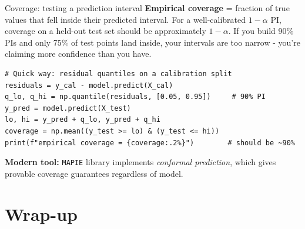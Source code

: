 \documentclass[aspectratio=169]{beamer}
\begin{document}
\begin{frame}[fragile]{Coverage: testing a prediction interval}
  \textbf{Empirical coverage} = fraction of true values that fell inside their predicted interval.
  \vfill
  For a well-calibrated $1-\alpha$ PI, coverage on a held-out test set should be approximately $1-\alpha$. If you build 90\% PIs and only 75\% of test points land inside, your intervals are too narrow - you're claiming more confidence than you have.
  \vfill
{\lstset{basicstyle=\ttfamily\scriptsize}
\begin{lstlisting}
# Quick way: residual quantiles on a calibration split
residuals = y_cal - model.predict(X_cal)
q_lo, q_hi = np.quantile(residuals, [0.05, 0.95])     # 90% PI
y_pred = model.predict(X_test)
lo, hi = y_pred + q_lo, y_pred + q_hi
coverage = np.mean((y_test >= lo) & (y_test <= hi))
print(f"empirical coverage = {coverage:.2%}")        # should be ~90%
\end{lstlisting}}
  \vfill
  \footnotesize \textbf{Modern tool:} \texttt{MAPIE} library implements \emph{conformal prediction}, which gives provable coverage guarantees regardless of model.
\end{frame}

\section{Wrap-up}
\end{document}
